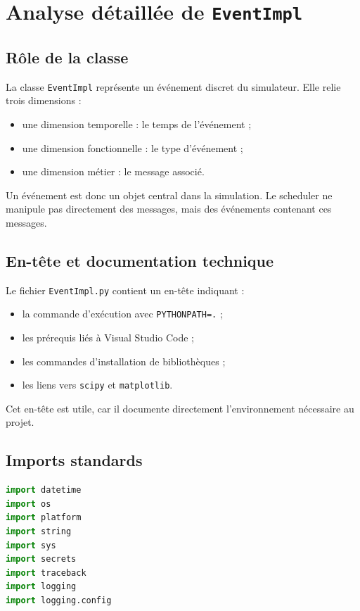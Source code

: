 \documentclass{article}
\begin{document}
\section{Analyse détaillée de \texttt{EventImpl}}

\subsection{Rôle de la classe}

La classe \texttt{EventImpl} représente un événement discret du simulateur. Elle relie trois dimensions :
\begin{itemize}[leftmargin=*]
    \item une dimension temporelle : le temps de l’événement ;
    \item une dimension fonctionnelle : le type d’événement ;
    \item une dimension métier : le message associé.
\end{itemize}

Un événement est donc un objet central dans la simulation. Le scheduler ne manipule pas directement des messages, mais des événements contenant ces messages.

\subsection{En-tête et documentation technique}

Le fichier \texttt{EventImpl.py} contient un en-tête indiquant :
\begin{itemize}[leftmargin=*]
    \item la commande d’exécution avec \texttt{PYTHONPATH=.} ;
    \item les prérequis liés à Visual Studio Code ;
    \item les commandes d’installation de bibliothèques ;
    \item les liens vers \texttt{scipy} et \texttt{matplotlib}.
\end{itemize}

Cet en-tête est utile, car il documente directement l’environnement nécessaire au projet.

\subsection{Imports standards}

\begin{lstlisting}[language=Python, caption=Imports standards de EventImpl]
import datetime
import os
import platform
import string
import sys
import secrets
import traceback
import logging
import logging.config
\end{lstlisting}
\end{document}
